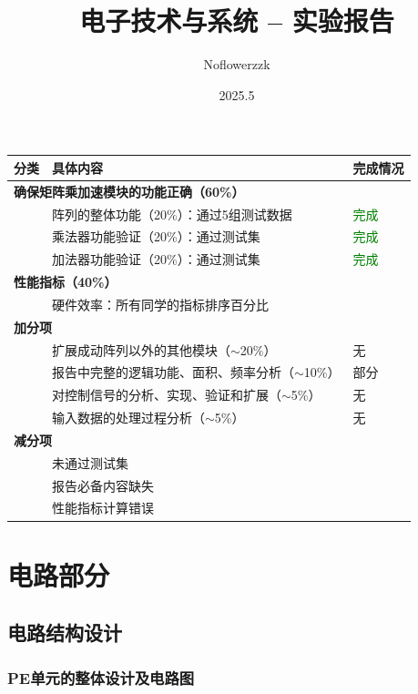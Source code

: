 \documentclass{article}
\title{电子技术与系统 -- 实验报告}
\author{Noflowerzzk}
\date{2025.5}
\begin{document}
\maketitle

\begin{tabularx}{\textwidth}{l X X}
\toprule
\textbf{分类\qquad\qquad} & \textbf{具体内容} & \textbf{完成情况} \\
\midrule
\multicolumn{3}{l}{\textbf{确保矩阵乘加速模块的功能正确（60\%）}} \\
& 阵列的整体功能（20\%）：通过5组测试数据 & \textcolor{green}{完成}\\
& 乘法器功能验证（20\%）：通过测试集 & \textcolor{green}{完成}\\
& 加法器功能验证（20\%）：通过测试集 & \textcolor{green}{完成}\\
\midrule
\multicolumn{3}{l}{\textbf{性能指标（40\%）}} \\
& 硬件效率：所有同学的指标排序百分比 & \\
\midrule
\multicolumn{3}{l}{\textbf{加分项}} \\
& 扩展成动阵列以外的其他模块（$\sim$20\%） & 无\\
& 报告中完整的逻辑功能、面积、频率分析（$\sim$10\%） & 部分\\
& 对控制信号的分析、实现、验证和扩展（$\sim$5\%） & 无\\
& 输入数据的处理过程分析（$\sim$5\%） & 无\\
\midrule
\multicolumn{3}{l}{\textbf{减分项}} \\
& 未通过测试集 & \\
& 报告必备内容缺失 & \\
& 性能指标计算错误 & \\
\bottomrule
\end{tabularx}

\section{电路部分}

\subsection{电路结构设计}

\subsubsection{PE单元的整体设计及电路图}
\end{document}
